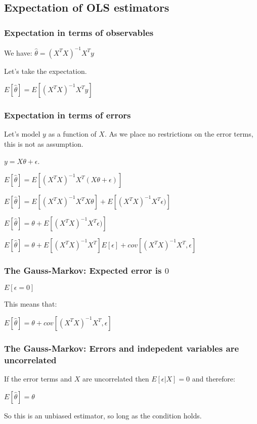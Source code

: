 
\subsection{Expectation of OLS estimators}

\subsubsection{Expectation in terms of observables}

We have: \(\hat{\theta }=(X^TX)^{-1}X^Ty\)

Let’s take the expectation.

\(E[\hat{\theta }]=E[(X^TX)^{-1}X^Ty]\)

\subsubsection{Expectation in terms of errors}

Let’s model \(y\) as a function of \(X\). As we place no restrictions on the error terms, this is not as assumption.

\(y=X\theta +\epsilon\). 

\(E[\hat{\theta }]=E[(X^TX)^{-1}X^T(X\theta +\epsilon)]\)

\(E[\hat{\theta }]=E[(X^TX)^{-1}X^TX\theta ]+E[(X^TX)^{-1}X^T \epsilon)]\)

\(E[\hat{\theta }]=\theta +E[(X^TX)^{-1}X^T \epsilon)]\)

\(E[\hat{\theta }]=\theta +E[(X^TX)^{-1}X^T]E[ \epsilon]+cov [(X^TX)^{-1}X^T ,\epsilon]\)

\subsubsection{The Gauss-Markov: Expected error is \(0\)}

\(E[\epsilon  =0]\)

This means that:

\(E[\hat{\theta }]=\theta + cov [(X^TX)^{-1}X^T ,\epsilon]\)

\subsubsection{The Gauss-Markov: Errors and indepedent variables are uncorrelated}

If the error terms and \(X\) are uncorrelated then \(E[\epsilon|X]=0\) and therefore:

\(E[\hat{\theta }]=\theta\)

So this is an unbiased estimator, so long as the condition holds.



